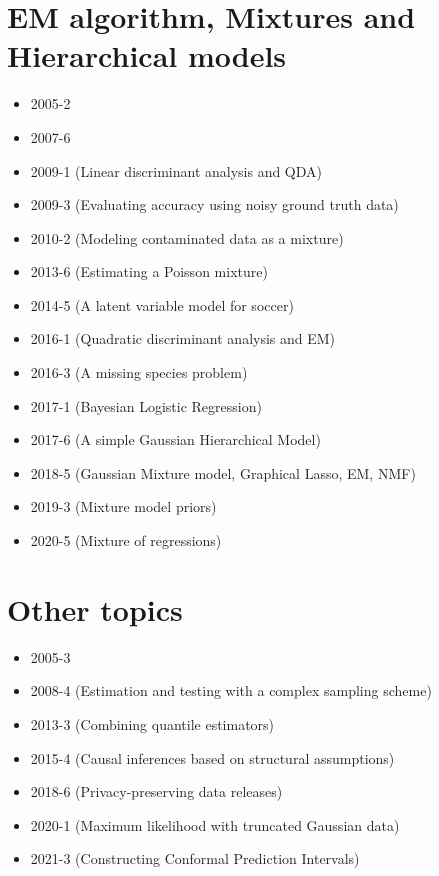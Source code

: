 \documentclass[12pt]{article}
\begin{document}
\section*{EM algorithm, Mixtures and Hierarchical models}
\begin{itemize}
\item 2005-2
\item 2007-6
\item 2009-1 (Linear discriminant analysis and QDA)
\item 2009-3 (Evaluating accuracy using noisy ground truth data)
\item 2010-2 (Modeling contaminated data as a mixture)	
\item 2013-6 (Estimating a Poisson mixture)
\item 2014-5 (A latent variable model for soccer)
\item 2016-1 (Quadratic discriminant analysis and EM)
\item 2016-3 (A missing species problem)
\item 2017-1 (Bayesian Logistic Regression)
\item 2017-6 (A simple Gaussian Hierarchical Model)
\item 2018-5 (Gaussian Mixture model, Graphical Lasso, EM, NMF)
\item 2019-3 (Mixture model priors)
\item 2020-5 (Mixture of regressions)

\end{itemize}
\section*{Other topics}
\begin{itemize}
\item 2005-3
\item 2008-4 (Estimation and testing with a complex sampling scheme)
\item 2013-3 (Combining quantile estimators)
\item 2015-4 (Causal inferences based on structural assumptions)
\item 2018-6 (Privacy-preserving data releases)
\item 2020-1 (Maximum likelihood with truncated Gaussian data)
\item 2021-3 (Constructing Conformal Prediction Intervals)
\end{itemize}
\end{document}
